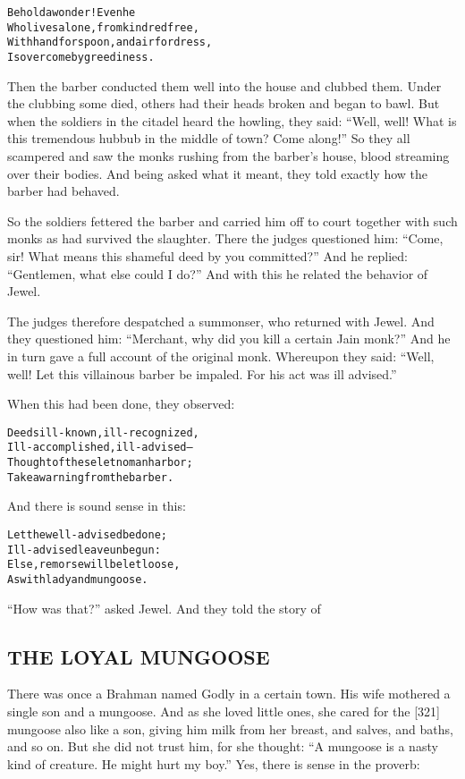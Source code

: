 \documentclass{article}
\renewenvironment{verbatim}{\begin{alltt}\normalfont\begin{centering}}{\end{centering}\end{alltt}}
\begin{document}
\begin{verbatim}
Behold a wonder! Even he
Who lives alone, from kindred free,
With hand for spoon, and air for dress,
Is overcome by greediness.
\end{verbatim}
Then the barber conducted them well into the house and clubbed
them. Under the clubbing some died, others had their heads broken
and began to bawl. But when the soldiers in the citadel heard the
howling, they said:
``Well, well! What is this tremendous hubbub in the middle of town? Come along!''
So they all scampered and saw the monks rushing from the barber's
house, blood streaming over their bodies. And being asked what it
meant, they told exactly how the barber had behaved.

So the soldiers fettered the barber and carried him off to court
together with such monks as had survived the slaughter. There the
judges questioned him:
``Come, sir! What means this shameful deed by you committed?'' And
he replied: ``Gentlemen, what else could I do?'' And with this he
related the behavior of Jewel.

The judges therefore despatched a summonser, who returned with
Jewel. And they questioned him:
``Merchant, why did you kill a certain Jain monk?'' And he in turn
gave a full account of the original monk. Whereupon they said:
``Well, well! Let this villainous barber be impaled. For his act was ill advised.''

When this had been done, they observed:

\begin{verbatim}
Deeds ill-known, ill-recognized,
Ill-accomplished, ill-advised--
Thought of these let no man harbor;
Take a warning from the barber.                         
\end{verbatim}
And there is sound sense in this:

\begin{verbatim}
Let the well-advised be done;
Ill-advised leave unbegun:
Else, remorse will be let loose,
As with lady and mungoose.
\end{verbatim}
``How was that?'' asked Jewel. And they told the story of

\subsection{THE LOYAL MUNGOOSE}

There was once a Brahman named Godly in a certain town. His wife
mothered a single son and a mungoose. And as she loved little ones,
she cared for the [321] mungoose also like a son, giving him milk
from her breast, and salves, and baths, and so on. But she did not
trust him, for she thought:
``A mungoose is a nasty kind of creature. He might hurt my boy.''
Yes, there is sense in the proverb:
\end{document}
